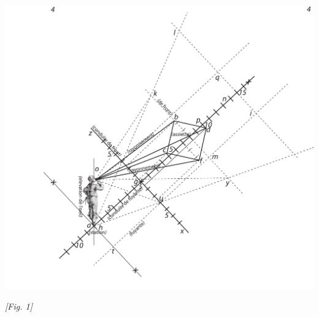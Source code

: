 \begin{center}
\includegraphics[width=1.0\textwidth]{images/T4-Desargues}
\\\rule[-4mm]{0mm}{10mm}\textit{[Fig. 1]}
\end{center}